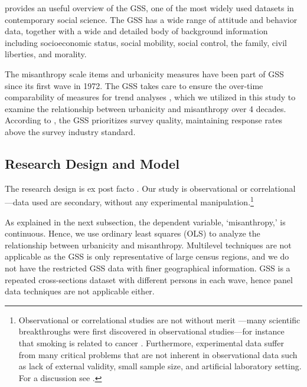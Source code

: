 \documentclass[11pt, letterpaper]{article}
\begin{document}
\begin{spacing}{1.4}
\citet{marsden20} provides an useful overview  of the GSS, one of the most
widely used datasets in contemporary social science. The GSS has a wide range of
attitude and behavior data, together with a wide and detailed body of background
information including socioeconomic status, social mobility,
social control, the family, civil liberties, and morality. %
%

The misanthropy scale items and urbanicity
measures have been part of GSS since its first wave in 1972. 
 The GSS takes care to ensure the over-time comparability of measures for trend analyses \citep{marsden20}, which we utilized in this study to examine the relationship between urbanicity and misanthropy over 4 decades. According to \citet{marsden20}, the GSS prioritizes survey quality, maintaining response rates above the survey industry standard.

\subsection*{Research Design and Model}

The research design is ex post facto \citep{mohr95}. Our study is observational or correlational---data used are secondary, without any experimental manipulation.\footnote{Observational or correlational studies are not
without merit%
---many scientific breakthroughs were first
discovered in observational studies---for instance that smoking is
related to cancer \citep[e.g.,][]{blanchflower11,oswald14}.
 Furthermore, experimental data %
 suffer from many critical problems that are not inherent in
observational data such as lack of external validity, small sample size, and  
artificial laboratory setting. %
For a discussion see \citet{pawson97}.}

As explained in the next subsection, the dependent variable, `misanthropy,' is
continuous. Hence, we  use ordinary least squares (OLS) to analyze the
relationship between urbanicity and  misanthropy.
Multilevel techniques are not applicable  as the GSS is only representative of
large census regions, and we do not have the restricted GSS data with finer
geographical information.
 GSS is a repeated cross-sections dataset with different persons in each wave, hence
 panel data techniques are not applicable either. 


\end{spacing}
\end{document}
